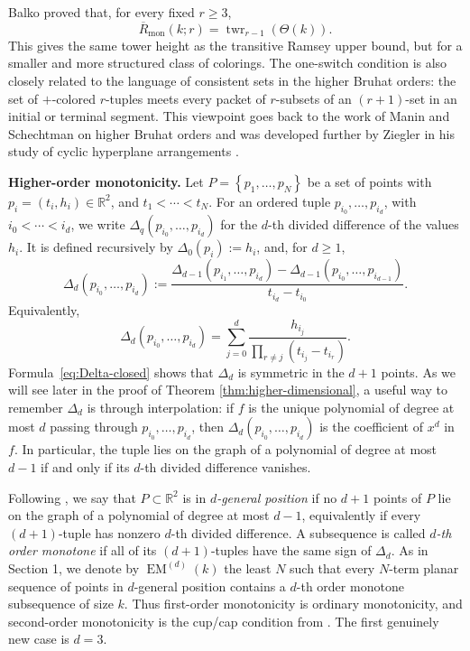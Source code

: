 \documentclass[11pt]{article}
\newcommand{\twr}{\operatorname{twr}}
\begin{document}
Balko proved that, for every fixed $r\ge 3$,
\begin{equation} \label{Balko}
\overline R_{\mathrm{mon}}(k;r)=\twr_{r-1}(\Theta(k)).
\end{equation}
This gives the same tower height as the transitive Ramsey upper bound, but for a
smaller and more structured class of colorings. The one-switch condition is also
closely related to the language of consistent sets in the higher Bruhat orders:
the set of $+$-colored $r$-tuples meets every packet of $r$-subsets of an
$(r+1)$-set in an initial or terminal segment. This viewpoint goes back to the work of Manin and Schechtman on higher Bruhat orders and was developed further
by Ziegler in his study of cyclic hyperplane arrangements
\cite{ManinSchechtman,ZieglerHBO}.

\bigskip

\noindent\textbf{Higher-order monotonicity.} Let $P=\left\{p_1,\dots,p_N\right\}$ be a set of points with $p_i=(t_i,h_i)\in\mathbb R^2$, and $t_1<\cdots<t_N$. For an ordered tuple $p_{i_0},\dots,p_{i_d}$, with $i_0<\cdots<i_d$, we write $\Delta_q(p_{i_0},\dots,p_{i_d})$
for the $d$-th divided difference of the values $h_i$. It is defined recursively by $\Delta_0(p_i):=h_i$, and, for $d\ge 1$,
\[
\Delta_d(p_{i_0},\dots,p_{i_d})
:=
\frac{
\Delta_{d-1}(p_{i_1},\dots,p_{i_d})
-
\Delta_{d-1}(p_{i_0},\dots,p_{i_{d-1}})
}
{t_{i_d}-t_{i_0}}.
\]
Equivalently,
\begin{equation}\label{eq:Delta-closed}
\Delta_d(p_{i_0},\dots,p_{i_d})
=
\sum_{j=0}^{d}
\frac{h_{i_j}}
{\prod_{r\ne j}(t_{i_j}-t_{i_r})}.
\end{equation}
Formula~\eqref{eq:Delta-closed} shows that $\Delta_d$ is symmetric in the $d+1$ points. As we will see later in the proof of Theorem \ref{thm:higher-dimensional}, a useful way to remember $\Delta_d$ is through interpolation: if $f$ is the unique polynomial of degree at most $d$ passing through $p_{i_0},\dots,p_{i_d}$, then $\Delta_d(p_{i_0},\dots,p_{i_d})$ is the coefficient of $x^d$ in $f$. In particular, the tuple lies on the graph of a polynomial of degree at most $d-1$ if and only if its $d$-th divided difference vanishes.

Following \cite{EM}, we say that $P \subset \mathbb{R}^{2}$ is in \emph{$d$-general position} if no $d+1$ points of $P$ lie on the graph of a polynomial of degree at most $d-1$, equivalently if every $(d+1)$-tuple has nonzero $d$-th divided difference. A subsequence is called \emph{$d$-th order monotone} if all of its $(d+1)$-tuples have the same sign of $\Delta_d$. As in Section 1, we denote by $\operatorname{EM}^{(d)}(k)$ the least $N$ such that every $N$-term planar sequence of points in $d$-general position contains a $d$-th order monotone subsequence of size $k$. Thus first-order monotonicity is ordinary monotonicity, and second-order monotonicity is the cup/cap condition from \cite{ES35}. The first genuinely new case is $d=3$. 
\end{document}
